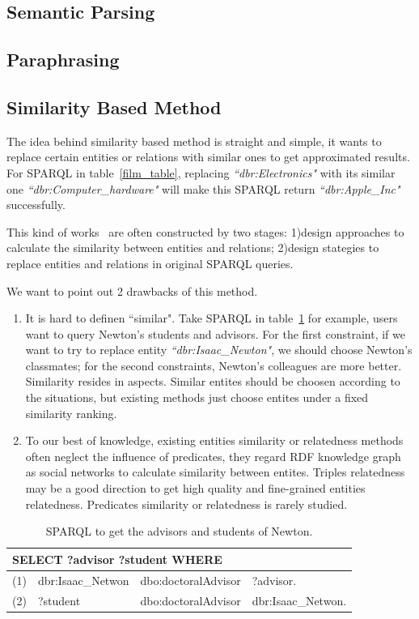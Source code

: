 \documentclass[runningheads]{llncs}
\begin{document}
\subsection{Semantic Parsing}
\subsection{Paraphrasing}
\subsection{Similarity Based Method}
The idea behind similarity based method is straight and simple, it wants to replace certain entities or relations with similar ones to get approximated results. For SPARQL in table~\ref{film_table}, replacing \textit{``dbr:Electronics"} with its similar one \textit{``dbr:Computer\_hardware"} will make this SPARQL return \textit{``dbr:Apple\_Inc"} successfully.

This kind of works~\cite{elbassuoni2011query} are often constructed by two stages: 1)design approaches to calculate the similarity between entities and relations; 2)design stategies to replace entities and relations in original SPARQL queries.

We want to point out 2 drawbacks of this method.
\begin{enumerate}
  \item It is hard to definen ``similar". Take SPARQL in table~\ref{Netwon_s_t} for example, users want to query Newton's students and advisors. For the first constraint, if we want to try to replace entity \textit{``dbr:Isaac\_Newton"}, we should choose Newton's classmates; for the second constraints, Newton's colleagues are more better. Similarity resides in aspects. Similar entites should be choosen according to the situations, but existing methods just choose entites under a fixed similarity ranking.
  \item To our best of knowledge, existing entities similarity or relatedness methods~\cite{ponza2017two,2014deepwalk} often neglect the influence of predicates, they regard RDF knowledge graph as social networks to calculate similarity between entites. Triples relatedness~\cite{2018weakly} may be a good direction to get high quality and fine-grained entities relatedness. Predicates similarity or relatedness is rarely studied.
\end{enumerate}
\begin{table}
\caption{SPARQL to get the advisors and students of Newton.}\label{Netwon_s_t}
\centering
\begin{tabular}{|c|lll|}
\hline
\multicolumn{4}{|l|}{SELECT ?advisor ?student WHERE }\\
\hline
(1) &  dbr:Isaac\_Netwon & dbo:doctoralAdvisor & ?advisor.\\
(2) & ?student & dbo:doctoralAdvisor & dbr:Isaac\_Netwon.\\
\hline
\end{tabular}
\end{table}
\end{document}
